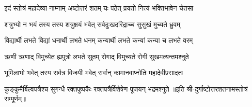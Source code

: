 \twolineshloka
{इदं स्तोत्रं महादेव्या नाम्नाम् अष्टोत्तरं शतम्}
{यः पठेत् प्रयतो नित्यं भक्तिभावेन चेतसा}

\twolineshloka
{शत्रुभ्यो न भयं तस्य तस्य शत्रुक्षयं भवेत्}
{सर्वदुःखदरिद्राच्च सुसुखं मुच्यते ध्रुवम्}

\twolineshloka
{विद्यार्थी लभते विद्यां धनार्थी लभते धनम्}
{कन्यार्थी लभते कन्यां कन्या च लभते वरम्}

\twolineshloka
{ऋणी ऋणाद् विमुच्येत ह्यपुत्रो लभते सुतम्}
{रोगाद् विमुच्यते रोगी सुखमत्यन्तमश्नुते}

\twolineshloka
{भूमिलाभो भवेत् तस्य सर्वत्र विजयी भवेत्}
{सर्वान् कामानवाप्नोति महादेवीप्रसादतः}

\twolineshloka
{कुङ्कुमैर्बिल्वपत्रैश्च सुगन्धै रक्तपुष्पकैः}
{रक्तपत्रैर्विशेषेण पूजयन् भद्रमश्नुते}
॥इति श्री-दुर्गाष्टोत्तरशतनामस्तोत्रं सम्पूर्णम्॥
